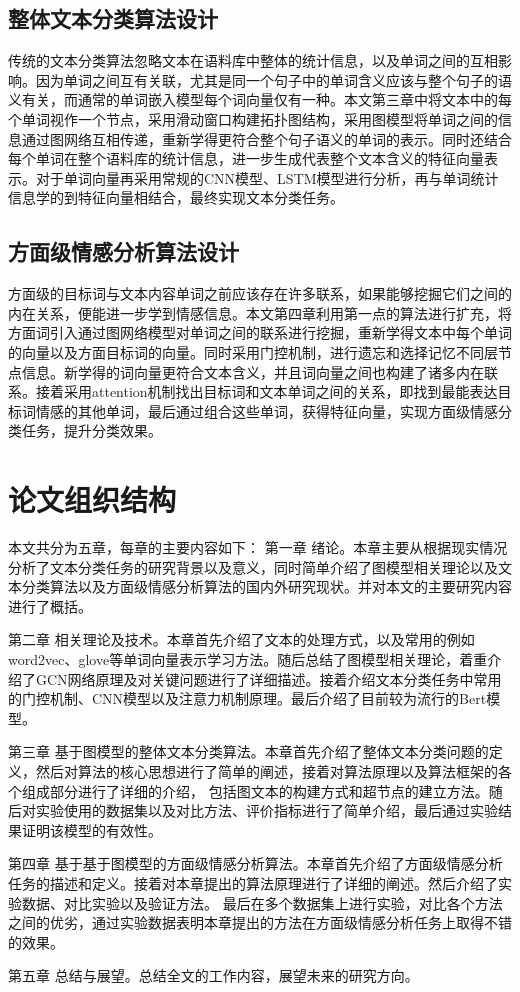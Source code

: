 \subsection{整体文本分类算法设计}
传统的文本分类算法忽略文本在语料库中整体的统计信息，以及单词之间的互相影响。因为单词之间互有关联，尤其是同一个句子中的单词含义应该与整个句子的语义有关，而通常的单词嵌入模型每个词向量仅有一种。本文第三章中将文本中的每个单词视作一个节点，采用滑动窗口构建拓扑图结构，采用图模型将单词之间的信息通过图网络互相传递，重新学得更符合整个句子语义的单词的表示。同时还结合每个单词在整个语料库的统计信息，进一步生成代表整个文本含义的特征向量表示。对于单词向量再采用常规的CNN模型、LSTM模型进行分析，再与单词统计信息学的到特征向量相结合，最终实现文本分类任务。
\subsection{方面级情感分析算法设计}
方面级的目标词与文本内容单词之前应该存在许多联系，如果能够挖掘它们之间的内在关系，便能进一步学到情感信息。本文第四章利用第一点的算法进行扩充，将方面词引入通过图网络模型对单词之间的联系进行挖掘，重新学得文本中每个单词的向量以及方面目标词的向量。同时采用门控机制，进行遗忘和选择记忆不同层节点信息。新学得的词向量更符合文本含义，并且词向量之间也构建了诸多内在联系。接着采用attention机制找出目标词和文本单词之间的关系，即找到最能表达目标词情感的其他单词，最后通过组合这些单词，获得特征向量，实现方面级情感分类任务，提升分类效果。
\section{论文组织结构}
本文共分为五章，每章的主要内容如下：
第一章 绪论。本章主要从根据现实情况分析了文本分类任务的研究背景以及意义，同时简单介绍了图模型相关理论以及文本分类算法以及方面级情感分析算法的国内外研究现状。并对本文的主要研究内容进行了概括。

第二章 相关理论及技术。本章首先介绍了文本的处理方式，以及常用的例如word2vec、glove等单词向量表示学习方法。随后总结了图模型相关理论，着重介绍了GCN网络原理及对关键问题进行了详细描述。接着介绍文本分类任务中常用的门控机制、CNN模型以及注意力机制原理。最后介绍了目前较为流行的Bert模型。

第三章 基于图模型的整体文本分类算法。本章首先介绍了整体文本分类问题的定义，然后对算法的核心思想进行了简单的阐述，接着对算法原理以及算法框架的各个组成部分进行了详细的介绍，
包括图文本的构建方式和超节点的建立方法。随后对实验使用的数据集以及对比方法、评价指标进行了简单介绍，最后通过实验结果证明该模型的有效性。

第四章 基于基于图模型的方面级情感分析算法。本章首先介绍了方面级情感分析任务的描述和定义。接着对本章提出的算法原理进行了详细的阐述。然后介绍了实验数据、对比实验以及验证方法。
最后在多个数据集上进行实验，对比各个方法之间的优劣，通过实验数据表明本章提出的方法在方面级情感分析任务上取得不错的效果。

第五章 总结与展望。总结全文的工作内容，展望未来的研究方向。 
